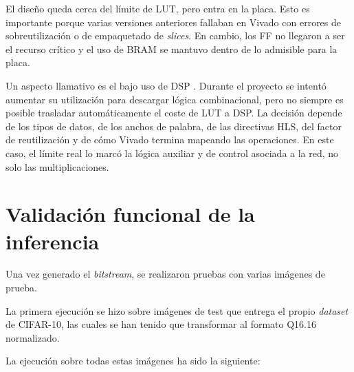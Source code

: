 El diseño queda cerca del límite de \ac{LUT}, pero entra en la placa. Esto es importante
porque varias
versiones anteriores fallaban en Vivado con errores de sobreutilización o de empaquetado
de \textit{slices}.
En cambio, los \ac{FF} no llegaron a ser el recurso crítico y el uso de \ac{BRAM} se
mantuvo dentro de lo
admisible para la placa.

Un aspecto llamativo es el bajo uso de \ac{DSP}
\citep{amdVitisHLS}. Durante el proyecto se intentó aumentar su utilización
para descargar lógica combinacional, pero no siempre es posible trasladar automáticamente el coste
de \ac{LUT} a \ac{DSP}. La decisión depende de los tipos de datos, de los anchos de palabra, de las
directivas \ac{HLS}, del factor de reutilización y de cómo Vivado termina mapeando las
operaciones. En
este caso, el límite real lo marcó la lógica auxiliar y de control asociada a la red, no solo las
multiplicaciones.

\section{Validación funcional de la inferencia}

Una vez generado el \textit{bitstream}, se realizaron pruebas con varias imágenes de prueba.

La primera ejecución se hizo sobre imágenes de test que entrega el propio \textit{dataset}
de \ac{CIFAR}-10, las cuales se han tenido que transformar al formato Q16.16 normalizado.

La ejecución sobre todas estas imágenes ha sido la siguiente:

